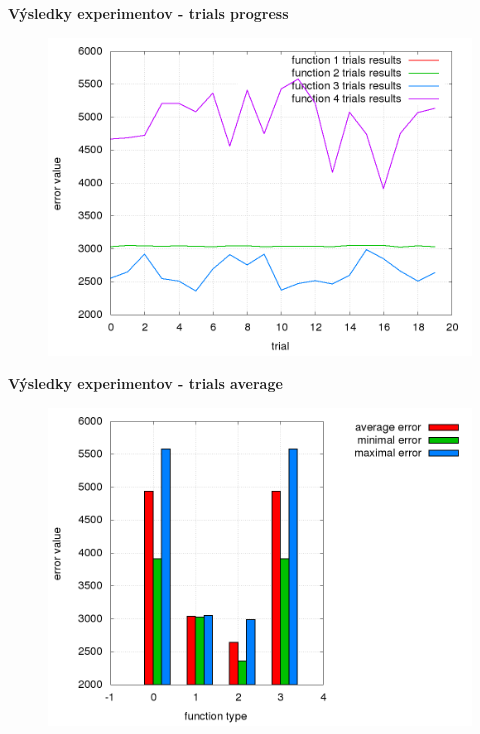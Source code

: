 \documentclass[xcolor=dvipsnames]{beamer}
\begin{document}
\begin{frame}{\bf Výsledky experimentov - trials progress}

\begin{figure}[!htb]
\centering
\includegraphics[scale=.36]{../../results_q_learning/map_1/trials_average_results_progress.png}
\end{figure}

\end{frame}



\begin{frame}{\bf Výsledky experimentov - trials average}

\begin{figure}[!htb]
\centering
\includegraphics[scale=.36]{../../results_q_learning/map_1/trials_average_results.png}
\end{figure}

\end{frame}
\end{document}
